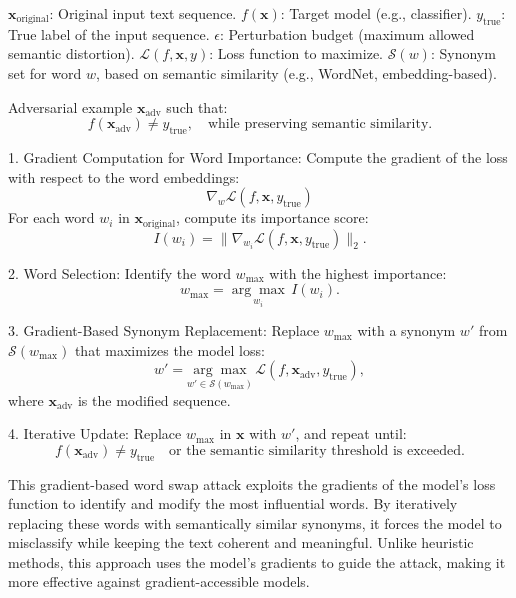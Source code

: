 $\mathbf{x}_{\text{original}}$: Original input text sequence.  
$f(\mathbf{x})$: Target model (e.g., classifier).  
$y_{\text{true}}$: True label of the input sequence.  
$\epsilon$: Perturbation budget (maximum allowed semantic distortion).  
$\mathcal{L}(f, \mathbf{x}, y)$: Loss function to maximize.  
$\mathcal{S}(w)$: Synonym set for word $w$, based on semantic similarity (e.g., WordNet, embedding-based).  

Adversarial example $\mathbf{x}_{\text{adv}}$ such that:
\[
f(\mathbf{x}_{\text{adv}}) \neq y_{\text{true}}, \quad \text{while preserving semantic similarity.}
\]

1. Gradient Computation for Word Importance:
   Compute the gradient of the loss with respect to the word embeddings:
   \[
   \nabla_w \mathcal{L}(f, \mathbf{x}, y_{\text{true}})
   \]
   For each word $w_i$ in $\mathbf{x}_{\text{original}}$, compute its importance score:
   \[
   I(w_i) = \|\nabla_{w_i} \mathcal{L}(f, \mathbf{x}, y_{\text{true}})\|_2.
   \]

2. Word Selection:
   Identify the word $w_{\text{max}}$ with the highest importance:
   \[
   w_{\text{max}} = \underset{w_i}{\arg \max} \, I(w_i).
   \]

3. Gradient-Based Synonym Replacement:
   Replace $w_{\text{max}}$ with a synonym $w'$ from $\mathcal{S}(w_{\text{max}})$ that maximizes the model loss:
   \[
   w' = \underset{w' \in \mathcal{S}(w_{\text{max}})}{\arg \max} \, \mathcal{L}(f, \mathbf{x}_{\text{adv}}, y_{\text{true}}),
   \]
   where $\mathbf{x}_{\text{adv}}$ is the modified sequence.

4. Iterative Update:
   Replace $w_{\text{max}}$ in $\mathbf{x}$ with $w'$, and repeat until:
   \[
   f(\mathbf{x}_{\text{adv}}) \neq y_{\text{true}} \quad \text{or the semantic similarity threshold is exceeded.}
   \]

This gradient-based word swap attack exploits the gradients of the model's loss function to identify and modify the most influential words. By iteratively replacing these words with semantically similar synonyms, it forces the model to misclassify while keeping the text coherent and meaningful. Unlike heuristic methods, this approach uses the model's gradients to guide the attack, making it more effective against gradient-accessible models.
